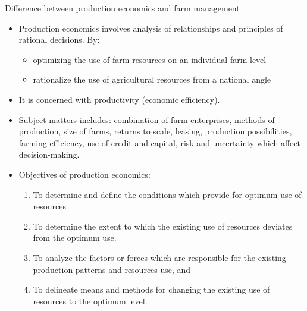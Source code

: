 \documentclass[12pt,ignorenonframetext,aspectratio=169]{beamer}
\providecommand{\tightlist}{%
  \setlength{\itemsep}{0pt}\setlength{\parskip}{0pt}}
\begin{document}
\begin{frame}{Difference between production economics and farm
management}
\protect\hypertarget{difference-between-production-economics-and-farm-management}{}
\begin{itemize}
\tightlist
\item
  Production economics involves analysis of relationships and principles
  of rational decisions. By:

  \begin{itemize}
  \tightlist
  \item
    optimizing the use of farm resources on an individual farm level
  \item
    rationalize the use of agricultural resources from a national angle
  \end{itemize}
\item
  It is concerned with productivity (economic efficiency).
\item
  Subject matters includes: combination of farm enterprises, methods of
  production, size of farms, returns to scale, leasing, production
  possibilities, farming efficiency, use of credit and capital, risk and
  uncertainty which affect decision-making.
\end{itemize}
\end{frame}

\begin{frame}{}
\protect\hypertarget{section}{}
\begin{itemize}
\tightlist
\item
  Objectives of production economics:

  \begin{enumerate}
  \tightlist
  \item
    To determine and define the conditions which provide for optimum use
    of resources
  \item
    To determine the extent to which the existing use of resources
    deviates from the optimum use.
  \item
    To analyze the factors or forces which are responsible for the
    existing production patterns and resources use, and
  \item
    To delineate means and methods for changing the existing use of
    resources to the optimum level.
  \end{enumerate}
\end{itemize}
\end{frame}
\end{document}

